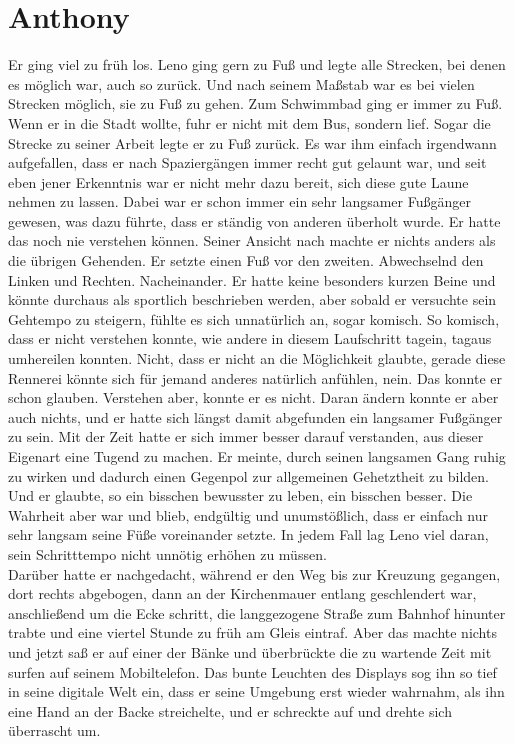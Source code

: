 \documentclass[ngerman,smalldemyvopaper,11pt,oneside,onecolumn,openright,extrafontsizes]{memoir}
\begin{document}
\chapter{Anthony}
Er ging viel zu früh los. Leno ging gern zu Fuß und legte alle Strecken, bei denen es möglich war, auch so zurück. Und nach seinem Maßstab war es bei vielen Strecken möglich, sie zu Fuß zu gehen. Zum Schwimmbad ging er immer zu Fuß. Wenn er in die Stadt wollte, fuhr er nicht mit dem Bus, sondern lief. Sogar die Strecke zu seiner Arbeit legte er zu Fuß zurück. Es war ihm einfach irgendwann aufgefallen, dass er nach Spaziergängen immer recht gut gelaunt war, und seit eben jener Erkenntnis war er nicht mehr dazu bereit, sich diese gute Laune nehmen zu lassen. Dabei war er schon immer ein sehr langsamer Fußgänger gewesen, was dazu führte, dass er ständig von anderen überholt wurde. Er hatte das noch nie verstehen können. Seiner Ansicht nach machte er nichts anders als die übrigen Gehenden. Er setzte einen Fuß vor den zweiten. Abwechselnd den Linken und Rechten. Nacheinander. Er hatte keine besonders kurzen Beine und könnte durchaus als sportlich beschrieben werden, aber sobald er versuchte sein Gehtempo zu steigern, fühlte es sich unnatürlich an, sogar komisch. So komisch, dass er nicht verstehen konnte, wie andere in diesem Laufschritt tagein, tagaus umhereilen konnten. Nicht, dass er nicht an die Möglichkeit glaubte, gerade diese Rennerei könnte sich für jemand anderes natürlich anfühlen, nein. Das konnte er schon glauben. Verstehen aber, konnte er es nicht.
Daran ändern konnte er aber auch nichts, und er hatte sich längst damit abgefunden ein langsamer Fußgänger zu sein. Mit der Zeit hatte er sich immer besser darauf verstanden, aus dieser Eigenart eine Tugend zu machen. Er meinte, durch seinen langsamen Gang ruhig zu wirken und dadurch einen Gegenpol zur allgemeinen Gehetztheit zu bilden. Und er glaubte, so ein bisschen bewusster zu leben, ein bisschen besser. Die Wahrheit aber war und blieb, endgültig und unumstößlich, dass er einfach nur sehr langsam seine Füße voreinander setzte. In jedem Fall lag Leno viel daran, sein Schritttempo nicht unnötig erhöhen zu müssen.
\vspace{0.5em} \\
Darüber hatte er nachgedacht, während er den Weg bis zur Kreuzung gegangen, dort rechts abgebogen, dann an der Kirchenmauer entlang geschlendert war, anschließend um die Ecke schritt, die langgezogene Straße zum Bahnhof hinunter trabte und eine viertel Stunde zu früh am Gleis eintraf. Aber das machte nichts und jetzt saß er auf einer der Bänke und überbrückte die zu wartende Zeit mit surfen auf seinem Mobiltelefon. Das bunte Leuchten des Displays sog ihn so tief in seine digitale Welt ein, dass er seine Umgebung erst wieder wahrnahm, als ihn eine Hand an der Backe streichelte, und er schreckte auf und drehte sich überrascht um.
\end{document}
